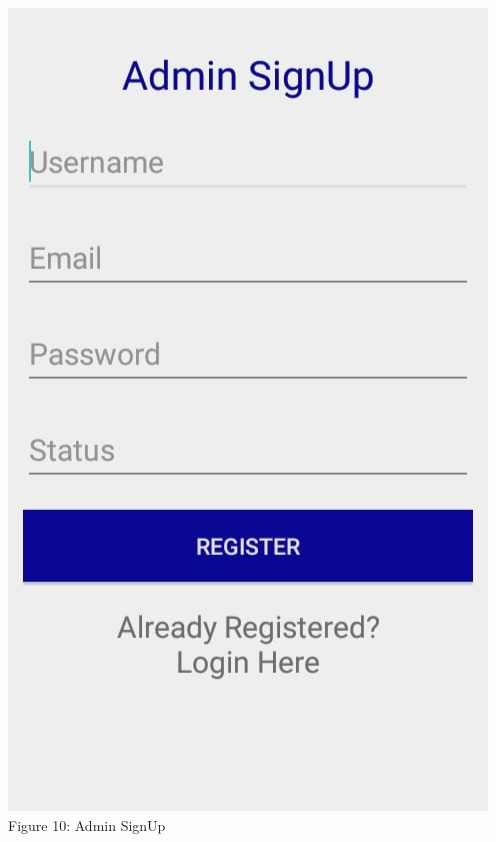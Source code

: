 \documentclass{article}
\begin{document}
\begin{center}
\includegraphics[scale=0.32]{f5}
\\Figure 10: Admin SignUp
\end{center}
\end{document}
